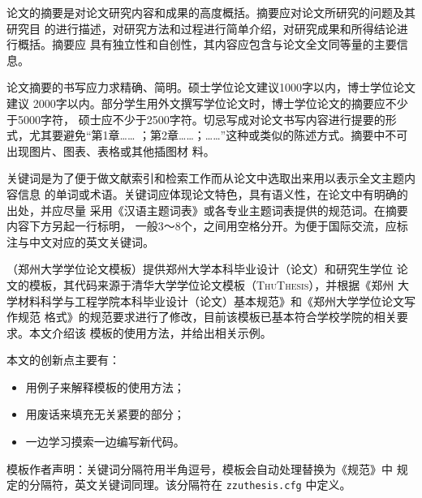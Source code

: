 \begin{cabstract}

论文的摘要是对论文研究内容和成果的高度概括。摘要应对论文所研究的问题及其研究目
的进行描述，对研究方法和过程进行简单介绍，对研究成果和所得结论进行概括。摘要应
具有独立性和自创性，其内容应包含与论文全文同等量的主要信息。

论文摘要的书写应力求精确、简明。硕士学位论文建议1000字以内，博士学位论文建议
2000字以内。部分学生用外文撰写学位论文时，博士学位论文的摘要应不少于5000字符，
硕士应不少于2500字符。切忌写成对论文书写内容进行提要的形式，尤其要避免“第1章……
；第2章……；……”这种或类似的陈述方式。摘要中不可出现图片、图表、表格或其他插图材
料。

关键词是为了便于做文献索引和检索工作而从论文中选取出来用以表示全文主题内容信息
的单词或术语。关键词应体现论文特色，具有语义性，在论文中有明确的出处，并应尽量
采用《汉语主题词表》或各专业主题词表提供的规范词。在摘要内容下方另起一行标明，
一般3～8个，之间用空格分开。为便于国际交流，应标注与中文对应的英文关键词。

\zzuthesis{}（郑州大学学位论文模板）提供郑州大学本科毕业设计（论文）和研究生学位
论文的模板，其代码来源于清华大学学位论文模板（\textsc{ThuThesis}），并根据《郑州
大学材料科学与工程学院本科毕业设计（论文）基本规范》和《郑州大学学位论文写作规范
格式》的规范要求进行了修改，目前该模板已基本符合学校学院的相关要求。本文介绍该
模板的使用方法，并给出相关示例。

本文的创新点主要有：

  \begin{itemize}
    \item 用例子来解释模板的使用方法；
    \item 用废话来填充无关紧要的部分；
    \item 一边学习摸索一边编写新代码。
  \end{itemize}

\textsf{模板作者声明}：关键词分隔符用半角逗号，模板会自动处理替换为《规范》中
规定的分隔符，英文关键词同理。该分隔符在 \texttt{zzuthesis.cfg} 中定义。

\end{cabstract}


